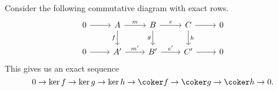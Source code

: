 \documentclass[main.tex]{subfiles}
\begin{document}
\begin{theorem}
  \label{thm:snake_lemma}
  Consider the following commutative diagram with exact rows.
  \begin{equation*}
    \begin{tikzcd}
      0
      \arrow[r]
      & A
      \arrow[d, swap, "f"]
      \arrow[r, "m"]
      & B
      \arrow[r, "e"]
      \arrow[d, swap, "g"]
      & C
      \arrow[r]
      \arrow[d, "h"]
      & 0
      \\
      0
      \arrow[r]
      & A'
      \arrow[r, "m'"]
      & B'
      \arrow[r, "e'"]
      & C'
      \arrow[r]
      & 0
    \end{tikzcd}
  \end{equation*}
  This gives us an exact sequence
  \begin{equation*}
    0 \to \ker f \to \ker g \to \ker h \to \coker f \to \coker g \to \coker h \to 0.
  \end{equation*}
\end{theorem}
\end{document}
